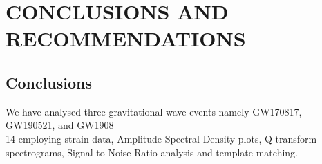 \chapter{CONCLUSIONS AND RECOMMENDATIONS}
\onehalfspacing

\section{Conclusions}
We have analysed three gravitational wave events namely GW170817, GW190521, and GW1908\\14 employing strain data, Amplitude Spectral Density plots, Q-transform spectrograms, Signal-to-Noise Ratio analysis and template matching. 
 



